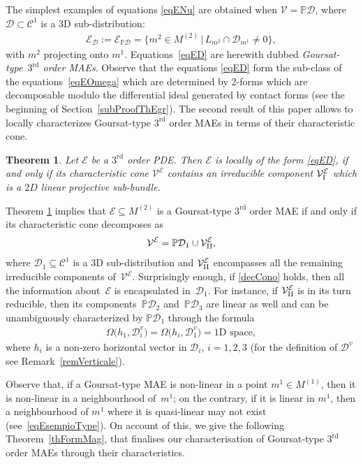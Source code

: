 \documentclass[pdftex]{sigma}
\newcommand{\C}{\mathcal{C}}
\newcommand{\D}{\mathcal{D}}
\newcommand{\M}{\mathcal{V}}
\newcommand{\MM}{\mathcal{V}_{\textrm{\normalfont I}}}
\newcommand{\MMM}{\mathcal{V}_{\textrm{\normalfont II}}}
\newcommand{\E}{\mathcal{E}}
\renewcommand{\P}{\mathbb{P}}
\newcommand{\Rd}{^\textrm{rd}}
\numberwithin{equation}{section}
\newtheorem{Theorem}{Theorem}[section]
\begin{document}
The simplest examples of equations \eqref{eqENu} are obtained when $\M=\P\D$, where $\D \subset \C^1$ is a 3D sub-distribution:
 \begin{gather}\label{eqED}
\E_{\D }:=\E_{\P\D }=\big\{ m^2\in M^{(2)}\,|\, L_{m^2}\cap\D_{m^1} \neq 0 \big\},
\end{gather}
with $m^2$ projecting onto $m^1$. Equations~\eqref{eqED} are herewith dubbed \emph{Goursat-type~$3\Rd$ order MAEs}.
Observe that the equations \eqref{eqED} form the sub-class of the equations~\eqref{eqEOmega} which are determined by 2-forms which are decomposable modulo the dif\/ferential ideal generated by contact forms (see the beginning of Section~\ref{subProofThEgr}).
The second result of this paper allows to locally characterizes Goursat-type $3\Rd$ order MAEs in terms of their characteristic cone.

\begin{Theorem}\label{thEgr}
Let $\E$ be a $3\Rd$ order PDE. Then $\E$ is locally of the form \eqref{eqED}, if and only if its characteristic cone $\M^\E$ contains an irreducible component $\MM^\E$ which is a $2D$ linear projective sub-bundle.
\end{Theorem}

Theorem \ref{thEgr}
implies that $\E\subseteq M^{(2)}$ is a Goursat-type $3\Rd$ order MAE if and only if its characteristic cone decomposes as
\begin{gather}\label{decCono}
 \M^\E= \P\D_1\cup\MMM^\E,
\end{gather}
where $\D_1\subseteq \C^1$ is a 3D sub-distribution and $\MMM^\E$ encompasses all the remaining irreducible components of~$\M^\E$. Surprisingly enough, if \eqref{decCono} holds, then all the information about~$\E$ is encapsulated in~$\D_1$.
For instance, if $\MMM^\E$ is in its turn reducible, then its components~$\P\D_2$ and~$\P\D_3$ are linear as well and can be unambiguously characterized by $\P\D_1$ through the formula
 \begin{gather}\label{eqFormulaMagica}
\Omega\big(h_1,\D_i^v\big)=\Omega\big(h_i,\D_1^v\big)=\textrm{1D space},
\end{gather}
where $h_i$ is a non-zero horizontal vector in $\D_i$, $i=1,2,3$ (for the def\/inition of $\D^v$ see Remark~\ref{remVerticale}).

Observe that, if a Goursat-type MAE is non-linear in a point $m^1\in M^{(1)}$, then it is non-linear in a neighbourhood of~$m^1$; on the contrary, if it is linear in $m^1$, then a neighbourhood of $m^1$ where it is quasi-linear may not exist (see~\eqref{eqEsempioType}). On account of this, we give the following Theorem~\ref{thFormMag}, that f\/inalises our characterisation of Goursat-type $3\Rd$ order MAEs through their characteristics.
\end{document}
